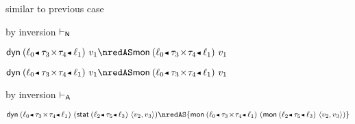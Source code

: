 {\begin{lamportproof*}
    \begin{pfproof}
      similar to previous case
    \end{pfproof}

    \begin{pfproof}
        \begin{pfproof}
          by inversion $\vdash_{\mathsf{N}}$
        \end{pfproof}
        \begin{pfproof}
          \qedstep
            \begin{pfproof}
              $\edynb{\obnd{\sowner_0}{\tpair{\stype_3}{\stype_4}}{\sowner_1}}{\svalue_1} \nredAS \emon{\obnd{\sowner_0}{\tpair{\stype_3}{\stype_4}}{\sowner_1}}{\svalue_1}$
            \end{pfproof}
        \end{pfproof}
        \begin{pfproof}
          \qedstep
            \begin{pfproof}
              $\edynb{\obnd{\sowner_0}{\tpair{\stype_3}{\stype_4}}{\sowner_1}}{\svalue_1} \nredAS \emon{\obnd{\sowner_0}{\tpair{\stype_3}{\stype_4}}{\sowner_1}}{\svalue_1}$
            \end{pfproof}
        \end{pfproof}
        \begin{pfproof}
            \begin{pfproof}
              by inversion $\vdash_{\mathsf{A}}$
            \end{pfproof}
          \qedstep
            \begin{pfproof}
              ${\edynb{\obnd{\sowner_0}{\tpair{\stype_3}{\stype_4}}{\sowner_1}}{(\estab{\obnd{\sowner_2}{\stype_5}{\sowner_3}}{\epair{\svalue_2}{\svalue_3}})}} \nredAS
               {\emon{\obnd{\sowner_0}{\tpair{\stype_3}{\stype_4}}{\sowner_1}}{(\emon{\obnd{\sowner_2}{\stype_5}{\sowner_3}}{\epair{\svalue_2}{\svalue_3}})}}$

\end{pfproof}
\end{pfproof}
\end{pfproof}
\end{lamportproof*}}

